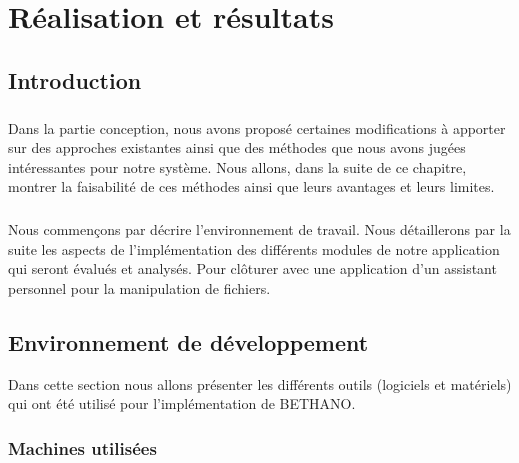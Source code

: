 \chapter{Réalisation et résultats}
\section{Introduction}
\paragraph{}Dans la partie conception, nous avons proposé certaines modifications à apporter sur des approches existantes ainsi que des méthodes que nous avons jugées intéressantes pour notre système. Nous allons, dans la suite de ce chapitre, montrer la faisabilité de ces méthodes ainsi que leurs avantages et leurs limites.
\paragraph{}Nous commençons par décrire l'environnement de travail. Nous détaillerons par la suite les aspects de l'implémentation des différents modules de notre application qui seront évalués et analysés. Pour clôturer avec une application d'un assistant personnel pour la manipulation de fichiers. 

\section{Environnement de développement}
Dans cette section nous allons présenter les différents outils (logiciels et matériels) qui ont été utilisé pour l'implémentation de BETHANO.
	\subsection{Machines utilisées}
